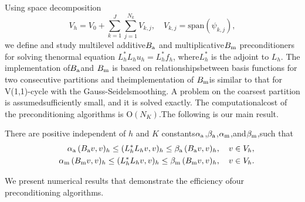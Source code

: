 \documentclass{report}
\begin{document}
Using space decomposition\[V_h=V_0+\sum_{k=1}^{J}\sum_{j=1}^{N_k}V_{k,j},
\quad V_{k,j}= \mbox{span}(\psi_{k,j}),\]we define and study multilevel additive$B_{\textup{\scriptsize a}}$ and multiplicative$B_{\textup{\scriptsize m}}$ preconditioners for solving thenormal equation $L_h^*L_hu_h=L_h^*f_h$,
where$L_h^*$ is the adjoint to $L_h$.
The implementation of$B_{\textup{\scriptsize a}}$and $B_{\textup{\scriptsize m}}$ is based on relationshipsbetween basis functions for two consecutive partitions and theimplementation of $B_{\textup{\scriptsize m}}$is similar to that for V(1,1)-cycle with the Gauss-Seidelsmoothing.
A problem on the coarsest partition is assumedsufficiently small,
and it is solved exactly.
The computationalcost of the preconditioning algorithms is $\mbox{O}(N_K)$.The following is our main result.\begin{theorem}There are positive independent of $h$ and $K$ constants$\alpha_{\textup{\scriptsize a}}$,$\beta_{\textup{\scriptsize a}}$,$\alpha_{\textup{\scriptsize m}}$,and$\beta_{\textup{\scriptsize m}}$,such that\begin{eqnarray}\label{eq:spectral_equiv}&&\alpha_{\textup{\scriptsize a}}\,(B_{\textup{\scriptsize a}}v,v)_h\leq (L_h^*L_hv,v)_h \leq\beta_{\textup{\scriptsize a}}\,(B_{\textup{\scriptsize a}}v,v)_h,\quad v\in V_h,\\\nonumber&&\alpha_{\textup{\scriptsize m}}\,(B_{\textup{\scriptsize m}}v,v)_h\leq (L_h^*L_hv,v)_h \leq\beta_{\textup{\scriptsize m}}\,(B_{\textup{\scriptsize m}}v,v)_h,\quad v\in V_h.\end{eqnarray}\end{theorem}We present numerical results that demonstrate the efficiency ofour preconditioning algorithms.
\end{document}
